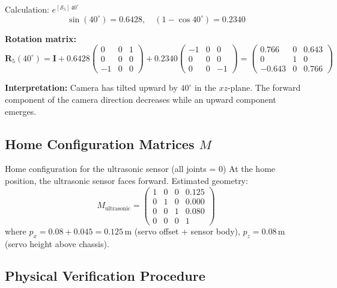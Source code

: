 \documentclass[12pt,a4paper]{article}
\newcommand{\mat}[1]{\mathbf{#1}}
\begin{document}
\begin{mathbox}{Calculation: $e^{[\mathcal{S}_5]\,40^\circ}$}
\[
  \sin(40^\circ) = 0.6428, \quad (1-\cos 40^\circ) = 0.2340
\]

\textbf{Rotation matrix:}
\[
  \mat{R}_5(40^\circ)
  = \mat{I}
  + 0.6428\begin{pmatrix}0&0&1\\0&0&0\\-1&0&0\end{pmatrix}
  + 0.2340\begin{pmatrix}-1&0&0\\0&0&0\\0&0&-1\end{pmatrix}
  = \begin{pmatrix}0.766&0&0.643\\0&1&0\\-0.643&0&0.766\end{pmatrix}
\]

\textbf{Interpretation:} Camera has tilted upward by $40^\circ$ in the $xz$-plane.
The forward component of the camera direction decreases while an upward
component emerges.
\end{mathbox}

\subsection{Home Configuration Matrices $M$}

\begin{mathbox}{Home configuration for the ultrasonic sensor (all joints = 0)}
At the home position, the ultrasonic sensor faces forward. Estimated geometry:
\[
  M_{\text{ultrasonic}}
  = \begin{pmatrix}
      1 & 0 & 0 & 0.125 \\
      0 & 1 & 0 & 0.000 \\
      0 & 0 & 1 & 0.080 \\
      0 & 0 & 0 & 1
    \end{pmatrix}
\]
where $p_x = 0.08 + 0.045 = 0.125$\,m (servo offset + sensor body),
$p_z = 0.08$\,m (servo height above chassis).
\end{mathbox}

\subsection{Physical Verification Procedure}
\end{document}
